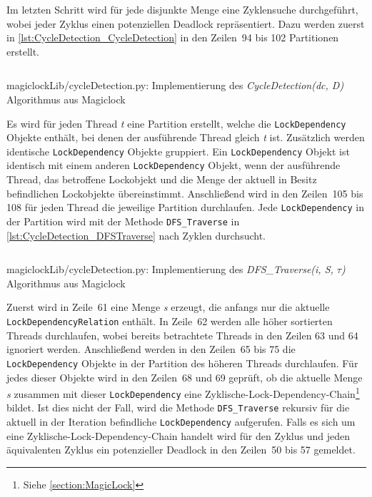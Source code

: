 Im letzten Schritt wird für jede disjunkte Menge eine Zyklensuche durchgeführt,
wobei jeder Zyklus einen potenziellen Deadlock repräsentiert. Dazu werden zuerst
in \cref{lst:CycleDetection_CycleDetection} in den Zeilen~94 bis 102 Partitionen
erstellt.
\begin{listing}[ht]
  \inputminted[frame=lines,linenos,firstline=78,lastline=108]{python}{./Python/magiclockLib/cycleDetection.py}
  \caption{magiclockLib/cycleDetection.py: Implementierung des \emph{CycleDetection(dc, D)} Algorithmus aus Magiclock\autocite[8]{MagicLock}}
  \label{lst:CycleDetection_CycleDetection}
\end{listing}
Es wird für jeden Thread \emph{t} eine Partition erstellt, welche die
\texttt{Lock\-Dependency} Objekte enthält, bei denen der ausführende Thread
gleich \emph{t} ist. Zusätzlich werden identische \texttt{Lock\-Dependency}
Objekte gruppiert. Ein \texttt{Lock\-Dependency} Objekt ist identisch mit einem
anderen \texttt{Lock\-Dependency} Objekt, wenn der ausführende Thread, das
betroffene Lockobjekt und die Menge der aktuell in Besitz befindlichen
Lockobjekte übereinstimmt. Anschließend wird in den Zeilen~105 bis 108 für jeden
Thread die jeweilige Partition durchlaufen. Jede \texttt{Lock\-Dependency} in
der Partition wird mit der Methode \texttt{DFS\_Traverse} in
\cref{lst:CycleDetection_DFSTraverse} nach Zyklen durchsucht.
\begin{listing}[ht]
  \inputminted[frame=lines,linenos,firstline=50,lastline=75]{python}{./Python/magiclockLib/cycleDetection.py}
  \caption{magiclockLib/cycleDetection.py: Implementierung des \emph{DFS\_Traverse(i, S, $\tau$)} Algorithmus aus Magiclock\autocite[8]{MagicLock}}
  \label{lst:CycleDetection_DFSTraverse}
\end{listing}

Zuerst wird in Zeile~61 eine Menge \emph{s} erzeugt, die anfangs nur die
aktuelle \texttt{Lock\-Dependency\-Relation} enthält. In Zeile~62 werden alle
höher sortierten Threads durchlaufen, wobei bereits betrachtete Threads in den
Zeilen 63 und 64 ignoriert werden. Anschließend werden in den Zeilen~65 bis 75
die \texttt{Lock\-Dependency} Objekte in der Partition des höheren Threads
durchlaufen. Für jedes dieser Objekte wird in den Zeilen~68 und 69 geprüft, ob
die aktuelle Menge \emph{s} zusammen mit dieser \texttt{Lock\-Dependency} eine
Zyklische-Lock-Dependency-Chain\footnote{Siehe \cref{section:MagicLock}} bildet.
Ist dies nicht der Fall, wird die Methode \texttt{DFS\_Traverse} rekursiv für
die aktuell in der Iteration befindliche \texttt{Lock\-Dependency} aufgerufen.
Falls es sich um eine Zyklische-Lock-Dependency-Chain handelt wird für den
Zyklus und jeden äquivalenten Zyklus ein potenzieller Deadlock in den Zeilen~50
bis 57 gemeldet.